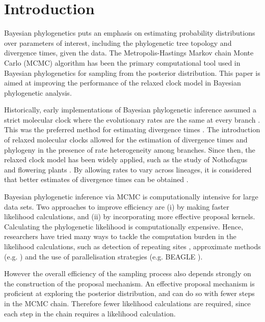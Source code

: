 \documentclass{bmcart}
\begin{document}

\section*{Introduction}
Bayesian phylogenetics puts an emphasis on estimating probability distributions over parameters of interest, including the phylogenetic tree topology and divergence times, given the data. The Metropolis-Hastings Markov chain Monte Carlo (MCMC) \cite{metropolis1953equation,hastings1970monte} algorithm has been the primary computational tool used in Bayesian phylogenetics for sampling from the posterior distribution. This paper is aimed at improving the performance of the relaxed clock model in Bayesian phylogenetic analysis.

Historically, early implementations of Bayesian phylogenetic inference \cite{yang1997bayesian} assumed a strict molecular clock where the evolutionary rates are the same at every branch \cite{zuckerkandl1965evolutionary}. This was the preferred method for estimating divergence times \cite{yang1997bayesian,rannala2003bayes}. The introduction of relaxed molecular clocks allowed for the estimation of divergence times \cite{thorne1998estimating} and phylogeny \cite{drummond2006relaxed} in the presence of rate heterogeneity among branches. Since then, the relaxed clock model has been widely applied, such as the study of Nothofagus \cite{knapp2005relaxed} and flowering plants \cite{smith2010uncorrelated}. By allowing rates to vary across lineages, it is considered that better estimates of divergence times can be obtained \cite{ho2005accuracy,renner2005relaxed,lepage2007general}.

Bayesian phylogenetic inference via MCMC is computationally intensive for large data sets.
Two approaches to improve efficiency are (i) by making faster likelihood calculations, and (ii) by incorporating more effective proposal kernels. Calculating the phylogenetic likelihood is computationally expensive.
Hence, researchers have tried many ways to tackle the computation burden in the likelihood calculations, such as detection of repeating sites \cite{kobert2017efficient},  approximate methods (e.g. \cite{reis2011approximate}) and the use of parallelisation strategies (e.g. BEAGLE \cite{ayres2011beagle}).

However the overall efficiency of the sampling process also depends strongly on the construction of the proposal mechanism. An effective proposal mechanism is proficient at exploring the posterior distribution, and can do so with fewer steps in the MCMC chain. Therefore fewer likelihood calculations are required, since each step in the chain requires a likelihood calculation.
\end{document}
